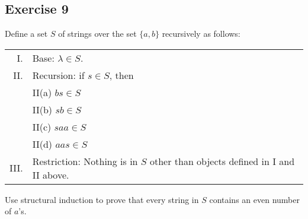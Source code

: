 \documentclass[14pt]{extarticle}
\begin{document}
\subsection{Exercise 9}
Define a set $S$ of strings over the set \(\{a, b\}\) recursively as follows:

\begin{tabular}{rl}
    I.   & Base: $\lambda \in S$.                                                       \\
    II.  & Recursion: if $s \in S$, then                                                \\
         & II(a) $bs \in S$                                                             \\
         & II(b) $sb \in S$                                                             \\
         & II(c) $saa \in S$                                                            \\
         & II(d) $aas \in S$                                                            \\
    III. & Restriction: Nothing is in $S$ other than objects defined in I and II above.
\end{tabular}

Use structural induction to prove that every string in $S$ contains an even number of $a$'s.
\end{document}

